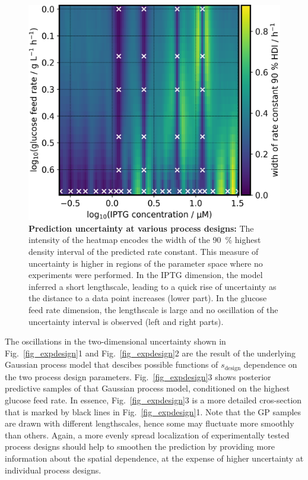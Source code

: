 \documentclass[sn-standardnature]{sn-jnl}%
\theoremstyle{thmstyleone}%
\theoremstyle{thmstyletwo}%
\theoremstyle{thmstylethree}%
\begin{document}
\begin{figure}[h]
    \centering
    \includegraphics[width=1.0\textwidth]{figures/plot_pp_dense_dense_k_design_interval.png}
    \caption{
        \textbf{Prediction uncertainty at various process designs:}
        The intensity of the heatmap encodes the width of the 90~\% highest density interval of the predicted rate constant.
        This measure of uncertainty is higher in regions of the parameter space where no experiments were performed.
        In the IPTG dimension, the model inferred a short lengthscale, leading to a quick rise of uncertainty as the distance to a data point increases (lower part).
        In the glucose feed rate dimension, the lengthscale is large and no oscillation of the uncertainty interval is observed (left and right parts).
    }
    \label{fig_sdesign_interval}
\end{figure}

The oscillations in the two-dimensional uncertainty shown in Fig.~\ref{fig_expdesign}1 and Fig.~\ref{fig_expdesign}2 are the result of the underlying Gaussian process model that descibes possible functions of $s_\text{design}$ dependence on the two process design parameters.
Fig.~\ref{fig_expdesign}3 shows posterior predictive samples of that Gaussian process model, conditioned on the highest glucose feed rate.
In essence, Fig.~\ref{fig_expdesign}3 is a more detailed cros-section that is marked by black lines in Fig.~\ref{fig_expdesign}1.
Note that the GP samples are drawn with different lengthscales, hence some may fluctuate more smoothly than others.
Again, a more evenly spread localization of experimentally tested process designs should help to smoothen the prediction by providing more information about the spatial dependence, at the expense of higher uncertainty at individual process designs.
\end{document}
